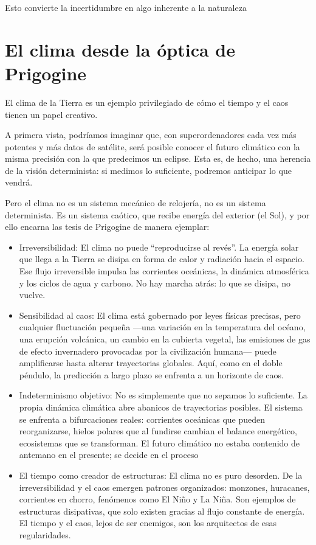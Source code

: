 \documentclass[
  11pt,
  a4paper,
  DIV=11,
  numbers=noendperiod]{scrreprt}
\begin{document}
Esto convierte la incertidumbre en algo inherente a la naturaleza

\chapter{El clima desde la óptica de
Prigogine}\label{el-clima-desde-la-uxf3ptica-de-prigogine}

El clima de la Tierra es un ejemplo privilegiado de cómo el tiempo y el
caos tienen un papel creativo.

A primera vista, podríamos imaginar que, con superordenadores cada vez
más potentes y más datos de satélite, será posible conocer el futuro
climático con la misma precisión con la que predecimos un eclipse. Esta
es, de hecho, una herencia de la visión determinista: si medimos lo
suficiente, podremos anticipar lo que vendrá.

Pero el clima no es un sistema mecánico de relojería, no es un sistema
determinista. Es un sistema caótico, que recibe energía del exterior (el
Sol), y por ello encarna las tesis de Prigogine de manera ejemplar:

\begin{itemize}
\item
  Irreversibilidad: El clima no puede ``reproducirse al revés''. La
  energía solar que llega a la Tierra se disipa en forma de calor y
  radiación hacia el espacio. Ese flujo irreversible impulsa las
  corrientes oceánicas, la dinámica atmosférica y los ciclos de agua y
  carbono. No hay marcha atrás: lo que se disipa, no vuelve.
\item
  Sensibilidad al caos: El clima está gobernado por leyes físicas
  precisas, pero cualquier fluctuación pequeña ---una variación en la
  temperatura del océano, una erupción volcánica, un cambio en la
  cubierta vegetal, las emisiones de gas de efecto invernadero
  provocadas por la civilización humana--- puede amplificarse hasta
  alterar trayectorias globales. Aquí, como en el doble péndulo, la
  predicción a largo plazo se enfrenta a un horizonte de caos.
\item
  Indeterminismo objetivo: No es simplemente que no sepamos lo
  suficiente. La propia dinámica climática abre abanicos de trayectorias
  posibles. El sistema se enfrenta a bifurcaciones reales: corrientes
  oceánicas que pueden reorganizarse, hielos polares que al fundirse
  cambian el balance energético, ecosistemas que se transforman. El
  futuro climático no estaba contenido de antemano en el presente; se
  decide en el proceso
\item
  El tiempo como creador de estructuras: El clima no es puro desorden.
  De la irreversibilidad y el caos emergen patrones organizados:
  monzones, huracanes, corrientes en chorro, fenómenos como El Niño y La
  Niña. Son ejemplos de estructuras disipativas, que solo existen
  gracias al flujo constante de energía. El tiempo y el caos, lejos de
  ser enemigos, son los arquitectos de esas regularidades.
\end{itemize}
\end{document}
